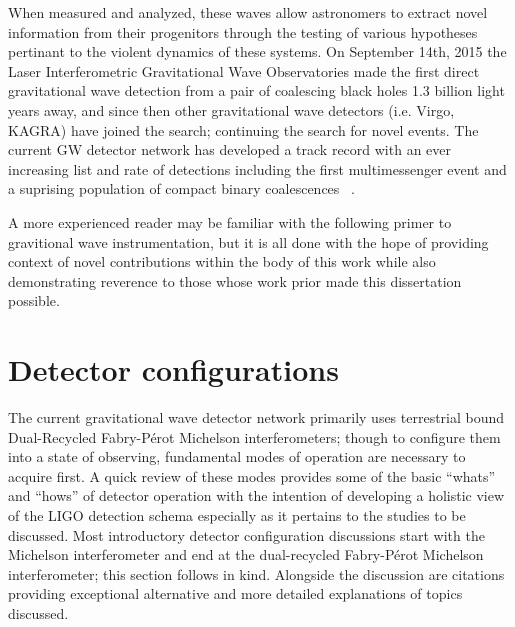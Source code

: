 When measured and analyzed, these waves allow astronomers to extract novel information from their progenitors through the testing of various hypotheses pertinant to the violent dynamics of these systems. On September 14th, 2015 the Laser Interferometric Gravitational Wave Observatories made the first direct gravitational wave detection from a pair of coalescing black holes 1.3 billion light years away, and since then other gravitational wave detectors (i.e. Virgo, KAGRA) have joined the search; continuing the search for novel events. The current GW detector network has developed a track record with an ever increasing list and rate of detections including the first multimessenger event and a suprising population of compact binary coalescences ~\cite{gw150914, gw170817, nitz:2023}. 

A more experienced reader may be familiar with the following primer to gravitional wave instrumentation, but it is all done with the hope of providing context of novel contributions within the body of this work while also demonstrating reverence to those whose work prior made this dissertation possible. 

\section{Detector configurations}\label{sec:detcon}
The current gravitational wave detector network primarily uses terrestrial bound Dual-Recycled Fabry-P\'erot Michelson interferometers; though to configure them into a state of observing, fundamental modes of operation are necessary to acquire first. A quick review of these modes provides some of the basic ``whats'' and ``hows'' of detector operation with the intention of developing a holistic view of the LIGO detection schema especially as it pertains to the studies to be discussed. Most introductory detector configuration discussions start with the Michelson interferometer and end at the dual-recycled Fabry-P\'erot Michelson interferometer; this section follows in kind. Alongside the discussion are citations providing exceptional alternative and more detailed explanations of topics discussed.

